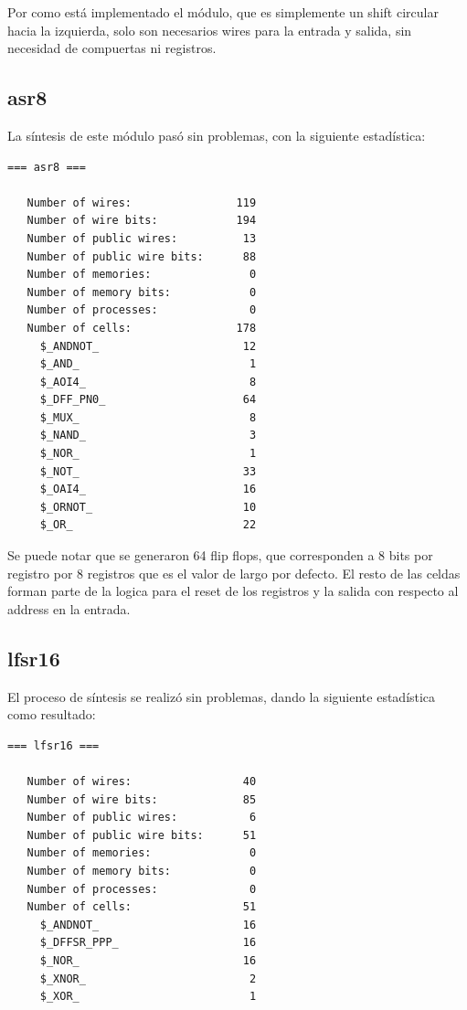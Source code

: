 \documentclass[letterpaper, 12pt]{article}
\numberwithin{equation}{section}
\begin{document}
Por como está implementado el módulo, que es simplemente un shift circular hacia la izquierda, solo son necesarios wires para la entrada y salida, sin necesidad de compuertas ni registros.

\subsection{asr8}

La síntesis de este módulo pasó sin problemas, con la siguiente estadística:

\begin{verbatim}
=== asr8 ===

   Number of wires:                119
   Number of wire bits:            194
   Number of public wires:          13
   Number of public wire bits:      88
   Number of memories:               0
   Number of memory bits:            0
   Number of processes:              0
   Number of cells:                178
     $_ANDNOT_                      12
     $_AND_                          1
     $_AOI4_                         8
     $_DFF_PN0_                     64
     $_MUX_                          8
     $_NAND_                         3
     $_NOR_                          1
     $_NOT_                         33
     $_OAI4_                        16
     $_ORNOT_                       10
     $_OR_                          22
\end{verbatim}

Se puede notar que se generaron 64 flip flops, que corresponden a 8 bits por registro por 8 registros que es el valor de largo por defecto. El resto de las celdas forman parte de la logica para el reset de los registros y la salida con respecto al address en la entrada.

\subsection{lfsr16}

El proceso de síntesis se realizó sin problemas, dando la siguiente estadística como resultado:

\begin{verbatim}
=== lfsr16 ===

   Number of wires:                 40
   Number of wire bits:             85
   Number of public wires:           6
   Number of public wire bits:      51
   Number of memories:               0
   Number of memory bits:            0
   Number of processes:              0
   Number of cells:                 51
     $_ANDNOT_                      16
     $_DFFSR_PPP_                   16
     $_NOR_                         16
     $_XNOR_                         2
     $_XOR_                          1
\end{verbatim}
\end{document}
